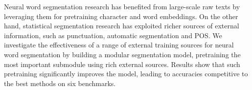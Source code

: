 Neural word segmentation research has benefited from large-scale raw texts by leveraging them for pretraining character and word embeddings. On the other hand, statistical segmentation research has exploited richer sources of external information, such as punctuation, automatic segmentation and POS. We investigate the effectiveness of a range of external training sources for neural word segmentation by building a modular segmentation model, pretraining the most important submodule using rich external sources. Results show that such pretraining significantly improves the model, leading to accuracies competitive to the best methods on six benchmarks.
